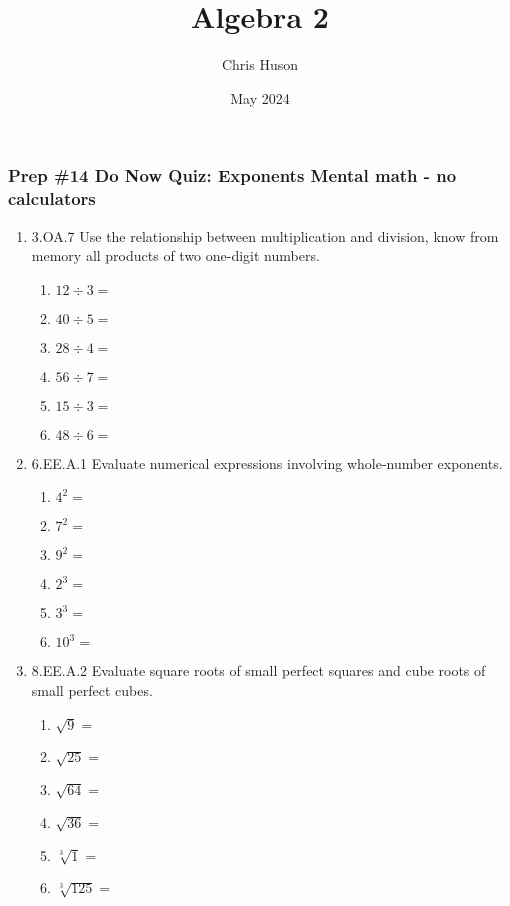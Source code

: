 \documentclass[12pt, twoside]{article}
\title{Algebra 2}
\author{Chris Huson}
\date{May 2024}
\begin{document}
\subsubsection*{Prep \#14 Do Now Quiz: Exponents \hfill Mental math - no calculators}
\begin{enumerate}[itemsep=0.5cm]

\item 3.OA.7 Use the relationship between multiplication and division, know from memory all products of two one-digit numbers.
    \begin{multicols}{2}
    \begin{enumerate}[itemsep=0.5cm]
        \item $12 \div 3 =$
        \item $40 \div 5 =$
        \item $28 \div 4 =$
        \item $56 \div 7 =$
        \item $15 \div 3 =$
        \item $48 \div 6 =$
    \end{enumerate}
    \end{multicols}

\item 6.EE.A.1 Evaluate numerical expressions involving whole-number exponents.
    \begin{multicols}{2}
    \begin{enumerate}[itemsep=0.5cm]
        \item $4^2=$
        \item $7^2=$
        \item $9^2=$
        \item $2^3=$
        \item $3^3=$
        \item $10^3=$
    \end{enumerate}
    \end{multicols}

\item 8.EE.A.2 Evaluate square roots of small perfect squares and cube roots of small perfect cubes.
    \begin{multicols}{2}
    \begin{enumerate}[itemsep=0.5cm]
        \item $\sqrt{9}=$
        \item $\sqrt{25}=$
        \item $\sqrt{64}=$
        \item $\sqrt{36}=$
        \item $\sqrt[3]{1}=$
        \item $\sqrt[3]{125}=$
    \end{enumerate}
    \end{multicols}


\end{enumerate}
\end{document}
